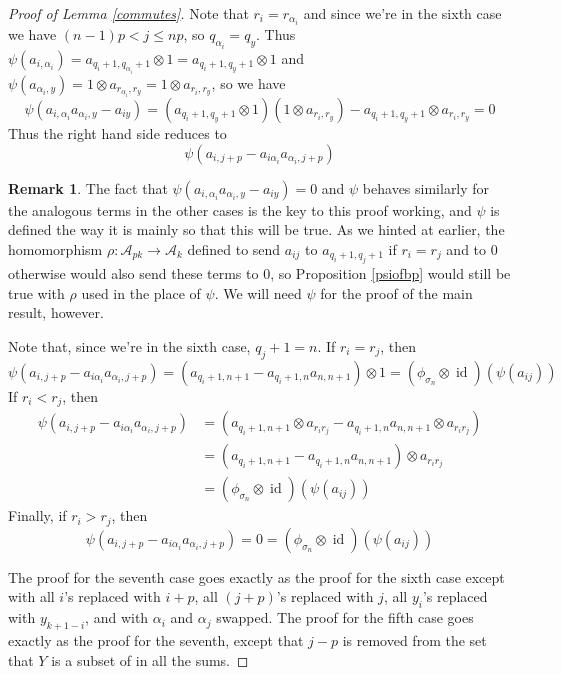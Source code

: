 \documentclass{amsart}[11pt,fullpage]
\def\ltblue{blue!20!white}
\def\A{{\mathcal A}}
\def\s{{\sigma}}
\def\a{\alpha}
\newcommand\id{\operatorname{id}}
\theoremstyle{definition}
\newtheorem{rem}[thm]{Remark}
\begin{document}
\begin{proof} [Proof of Lemma \ref{commutes}]
Note that $r_i = r_{\a_i}$ and since we're in the sixth case we have $(n-1)p<j\le np$, so $q_{\a_i}=q_y$. Thus $\psi(a_{i,\a_i}) = a_{q_i+1,q_{\a_i}+1}\otimes 1 = a_{q_i+1,q_y+1}\otimes 1$ and $\psi(a_{\a_i,y}) = 1\otimes a_{r_{\a_i},r_y} = 1\otimes a_{r_i,r_y}$, so we have
$$\psi(a_{i,\a_i}a_{\a_i,y} - a_{iy}) = \left(a_{q_i+1,q_y+1}\otimes 1\right)\left(1\otimes a_{r_i,r_y}\right) - a_{q_i+1,q_y+1}\otimes a_{r_i,r_y} = 0$$
Thus the right hand side reduces to 
$$\psi\left(a_{i,j+p} - a_{i\a_i}a_{\a_i,j+p}\right)$$

\begin{rem}
The fact that $\psi(a_{i,\a_i}a_{\a_i,y} - a_{iy}) = 0$ and $\psi$ behaves similarly for the analogous terms in the other cases is the key to this proof working, and $\psi$ is defined the way it is mainly so that this will be true. As we hinted at earlier, the homomorphism $\rho\colon \A_{pk}\rightarrow \A_k$ defined to send $a_{ij}$ to $a_{q_i+1,q_j+1}$ if $r_i=r_j$ and to 0 otherwise would also send these terms to 0, so Proposition \ref{psiofbp} would still be true with $\rho$ used in the place of $\psi$. We will need $\psi$ for the proof of the main result, however.
\end{rem}

\noindent Note that, since we're in the sixth case, $q_j + 1 = n$. If $r_i = r_j$, then 
$$\psi\left(a_{i,j+p} - a_{i\a_i}a_{\a_i,j+p}\right) = \left(a_{q_i+1,n+1} - a_{q_i+1,n}a_{n,n+1}\right)\otimes 1 = (\phi_{\s_n} \otimes \id)(\psi(a_{ij}))$$
If $r_i < r_j$, then
\begin{align*}
\psi\left(a_{i,j+p} - a_{i\a_i}a_{\a_i,j+p}\right) &= \left(a_{q_i+1,n+1}\otimes a_{r_ir_j} - a_{q_i+1,n}a_{n,n+1}\otimes a_{r_ir_j}\right)\\
&= \left(a_{q_i+1,n+1} - a_{q_i+1,n}a_{n,n+1}\right)\otimes a_{r_ir_j}\\
&= (\phi_{\s_n} \otimes \id)(\psi(a_{ij}))
\end{align*}
Finally, if $r_i > r_j$, then
$$\psi\left(a_{i,j+p} - a_{i\a_i}a_{\a_i,j+p}\right) = 0 = (\phi_{\s_n} \otimes \id)(\psi(a_{ij}))$$

The proof for the seventh case goes exactly as the proof for the sixth case except with all $i$'s replaced with $i+p$, all $(j+p)$'s replaced with $j$, all $y_i$'s replaced with $y_{k+1-i}$, and with $\a_i$ and $\a_j$ swapped. The proof for the fifth case goes exactly as the proof for the seventh, except that $j-p$ is removed from the set that $Y$ is a subset of in all the sums.\todo[color=\ltblue]{check this}
\end{proof}
\end{document}

